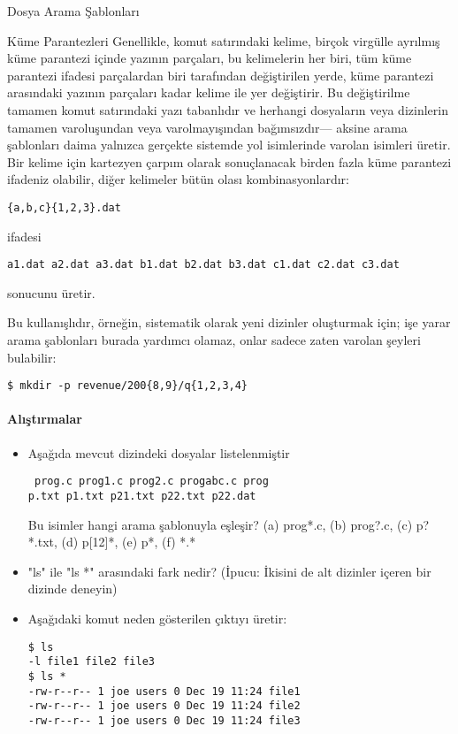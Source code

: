 \begin{section}{Dosya Arama Şablonları}
\begin{subsection}{Küme Parantezleri}
Genellikle, komut satırındaki kelime, birçok virgülle ayrılmış küme parantezi içinde yazının parçaları, bu kelimelerin her biri, tüm küme parantezi ifadesi parçalardan biri tarafından değiştirilen yerde, küme parantezi arasındaki yazının parçaları kadar kelime ile yer değiştirir. Bu değiştirilme tamamen komut satırındaki yazı tabanlıdır ve herhangi dosyaların veya dizinlerin tamamen varoluşundan veya varolmayışından bağımsızdır— aksine arama şablonları daima yalnızca gerçekte sistemde yol isimlerinde varolan isimleri üretir.
Bir kelime için kartezyen çarpım olarak sonuçlanacak birden fazla küme parantezi ifadeniz olabilir, diğer kelimeler bütün olası kombinasyonlardır:
\begin{verbatim}
{a,b,c}{1,2,3}.dat
\end{verbatim}
ifadesi
\begin{verbatim}
a1.dat a2.dat a3.dat b1.dat b2.dat b3.dat c1.dat c2.dat c3.dat
\end{verbatim}
sonucunu üretir.

Bu kullanışlıdır, örneğin, sistematik olarak yeni dizinler oluşturmak için; işe yarar arama şablonları burada yardımcı olamaz, onlar sadece zaten varolan şeyleri bulabilir:
\begin{verbatim}
$ mkdir -p revenue/200{8,9}/q{1,2,3,4}
\end{verbatim}
\paragraph{Alıştırmalar}{
\begin{itemize}
 \item Aşağıda mevcut dizindeki dosyalar listelenmiştir\begin{verbatim}
 prog.c prog1.c prog2.c progabc.c prog
p.txt p1.txt p21.txt p22.txt p22.dat
 \end{verbatim}Bu isimler hangi arama şablonuyla eşleşir? (a) prog*.c, (b) prog?.c, (c) p?*.txt, (d) p[12]*, (e) p*, (f) *.*
 \item "ls" ile "ls *" arasındaki fark nedir? (İpucu: İkisini de alt dizinler içeren bir dizinde deneyin)
 \item Aşağıdaki komut neden gösterilen çıktıyı üretir:\begin{verbatim}
$ ls
-l file1 file2 file3
$ ls *
-rw-r--r-- 1 joe users 0 Dec 19 11:24 file1
-rw-r--r-- 1 joe users 0 Dec 19 11:24 file2
-rw-r--r-- 1 joe users 0 Dec 19 11:24 file3
 \end{verbatim}
\end{itemize}}

\end{subsection}
\end{section}
